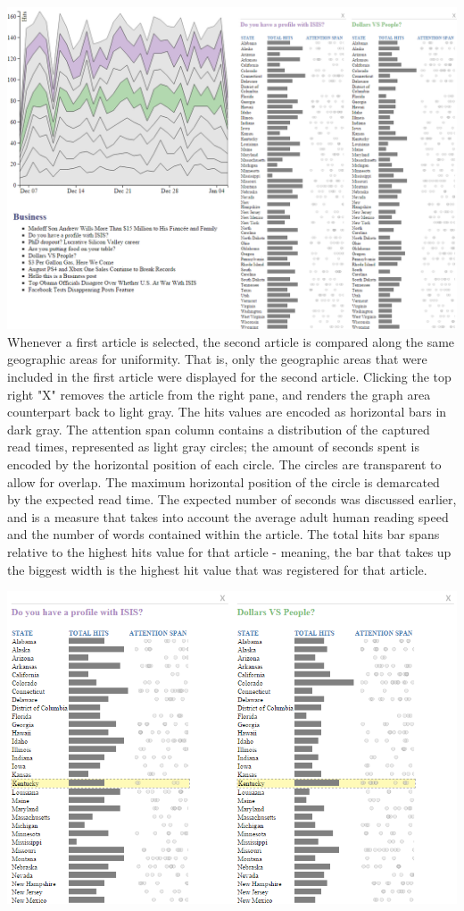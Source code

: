 \documentclass[12pt]{article}
\begin{document}
\noindent\includegraphics[scale=0.5]{img/viz_8} \\

Whenever a first article is selected, the second article is compared along the same geographic areas for uniformity. That is, only the geographic areas that were included in the first article were displayed for the second article. Clicking the top right "X" removes the article from the right pane, and renders the graph area counterpart back to light gray. 
The hits values are encoded as horizontal bars in dark gray. The attention span column contains a distribution of the captured read times, represented as light gray circles; the amount of seconds spent is encoded by the horizontal position of each circle. The circles are transparent to allow for overlap. The maximum horizontal position of the circle is demarcated by the expected read time. The expected number of seconds was discussed earlier, and is a measure that takes into account the average adult human reading speed and the number of words contained within the article. The total hits bar spans relative to the highest hits value for that article - meaning, the bar that takes up the biggest width is the highest hit value that was registered for that article. 

\vfill

\noindent\includegraphics[scale=0.8]{img/viz_9} \\
\end{document}
